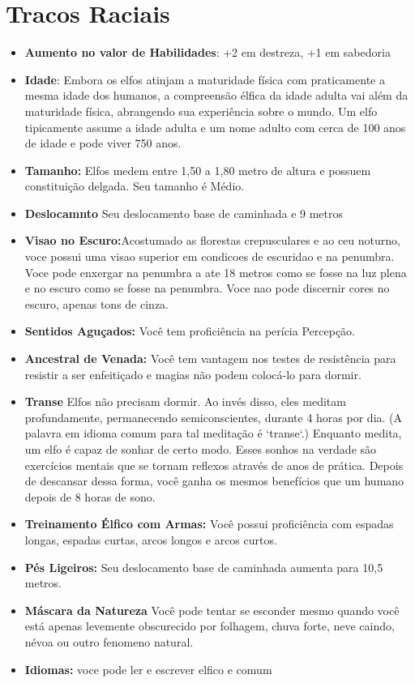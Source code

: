 \documentclass{book}
\begin{document}
\section{Tracos Raciais}
\begin{itemize}
    \item \textbf{Aumento no valor de Habilidades}: +2 em destreza, +1 em sabedoria 
    \item \textbf{Idade}: Embora os elfos atinjam a maturidade física com praticamente a mesma 
          idade dos humanos, a compreensão élfica da idade adulta vai além da maturidade 
          física, abrangendo sua experiência sobre o mundo. Um elfo tipicamente assume 
          a idade adulta e um nome adulto com cerca de 100 anos de idade e pode viver
          750 anos.
    \item \textbf{Tamanho:} Elfos medem entre 1,50 a 1,80 metro de altura e possuem 
          constituição delgada. Seu tamanho é Médio.
    \item \textbf{Deslocamnto} Seu deslocamento base de caminhada e 9 metros
    \item \textbf{Visao no Escuro:}Acostumado as florestas crepusculares e ao ceu noturno, voce
          possui uma visao superior em condicoes de escuridao e na penumbra. Voce pode 
          enxergar na penumbra a ate 18 metros como se fosse na luz plena e no escuro 
          como se fosse na penumbra. Voce nao pode discernir cores no escuro, apenas tons
          de cinza.
    \item \textbf{Sentidos Aguçados:} Você tem proficiência na perícia Percepção.
    \item \textbf{Ancestral de Venada:} Você tem vantagem nos testes de resistência para 
          resistir  a ser enfeitiçado e magias não podem colocá-lo para dormir.
    \item \textbf{Transe} Elfos não precisam dormir. Ao invés disso, eles meditam 
          profundamente, permanecendo semiconscientes, durante 4 horas por 
          dia. (A palavra em idioma comum para tal meditação é `transe`.) Enquanto
          medita, um elfo é capaz de sonhar de certo modo. Esses sonhos na verdade 
          são exercícios mentais que se tornam reflexos através de anos de prática.
          Depois de descansar dessa forma, você ganha os mesmos benefícios que um
          humano depois de 8 horas de sono.
    \item \textbf{Treinamento Élfico com Armas:} Você possui proficiência com espadas 
          longas, espadas curtas, arcos longos e arcos curtos.
    \item \textbf{Pés Ligeiros:} Seu deslocamento base de caminhada aumenta para 10,5 metros.

    \item \textbf{Máscara da Natureza} Você pode tentar se esconder mesmo quando você está
          apenas levemente obscurecido por folhagem, chuva forte, neve caindo, névoa ou 
          outro fenomeno natural.
    \item \textbf{Idiomas:} voce pode ler e escrever elfico e comum 
\end{itemize} 
\end{document}
